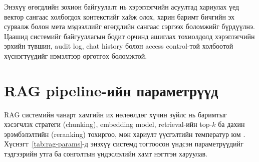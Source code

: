 Энэхүү өгөгдлийн зохион байгуулалт нь хэрэглэгчийн асуултад хариулах үед вектор сангаас холбогдох контекстийг хайж олох, харин баримт бичгийн эх сурвалж болон мета мэдээллийг өгөгдлийн сангаас сэргээх боломжийг бүрдүүлнэ. Цаашид системийг байгууллагын бодит орчинд ашиглах тохиолдолд хэрэглэгчийн эрхийн түвшин, audit log, chat history болон access control-той холбоотой хүснэгтүүдийг нэмэлтээр өргөтгөх боломжтой.

\section{RAG pipeline-ийн параметрүүд}

RAG системийн чанарт хамгийн их нөлөөлдөг хүчин зүйлс нь баримтыг хэсэгчлэх стратеги (chunking), embedding model, retrieval-ийн top-$k$ ба дахин эрэмбэлэлтийн (reranking) тохиргоо, мөн хариулт үүсгэлтийн температур юм \cite{rag_survey, dpr}. Хүснэгт~\ref{tab:rag-params}-д энэхүү системд тогтоосон үндсэн параметрүүдийг тэдгээрийн утга ба сонголтын үндэслэлийн хамт нэгтгэн харуулав.

